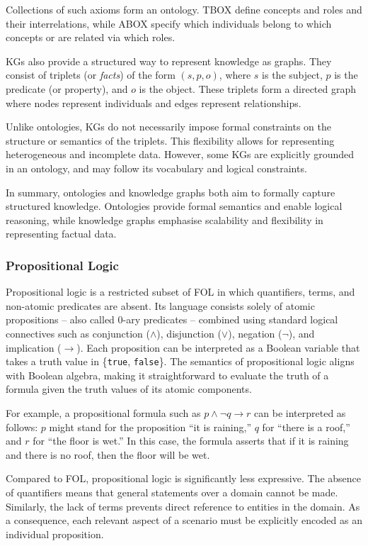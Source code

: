Collections of such axioms form an ontology.
%
\Gls{TBOX} define concepts and roles and their interrelations, while \gls{ABOX} specify which individuals belong to which concepts or are related via which roles.

\Glspl{KG} also provide a structured way to represent knowledge as graphs.
%
They consist of triplets (or \emph{facts}) of the form $(s, p, o)$, where $s$ is the subject, $p$ is the predicate (or property), and $o$ is the object.
%
These triplets form a directed graph where nodes represent individuals and edges represent relationships.

Unlike ontologies, KGs do not necessarily impose formal constraints on the structure or semantics of the triplets.
%
This flexibility allows for representing heterogeneous and incomplete data.
%
However, some \glspl{KG} are explicitly grounded in an ontology, and may follow its vocabulary and logical constraints.

In summary, ontologies and knowledge graphs both aim to formally capture structured knowledge.
%
Ontologies provide formal semantics and enable logical reasoning, while knowledge graphs emphasise scalability and flexibility in representing factual data.


\subsubsection{Propositional Logic}\label{subsubsec:propositional-logic}
%
Propositional logic is a restricted subset of \gls{FOL} in which quantifiers, terms, and non-atomic predicates are absent.
%
Its language consists solely of atomic propositions -- also called 0-ary predicates -- combined using standard logical connectives such as conjunction ($\land$), disjunction ($\lor$), negation ($\lnot$), and implication ($\rightarrow$).
%
Each proposition can be interpreted as a Boolean variable that takes a truth value in \{\texttt{true}, \texttt{false}\}.
%
The semantics of propositional logic aligns with Boolean algebra, making it straightforward to evaluate the truth of a formula given the truth values of its atomic components.

For example, a propositional formula such as $p \land \lnot q \rightarrow r$ can be interpreted as follows:
%
$p$ might stand for the proposition ``it is raining,'' $q$ for ``there is a roof,'' and $r$ for ``the floor is wet.''
%
In this case, the formula asserts that if it is raining and there is no roof, then the floor will be wet.

Compared to \gls{FOL}, propositional logic is significantly less expressive.
%
The absence of quantifiers means that general statements over a domain cannot be made.
%
Similarly, the lack of terms prevents direct reference to entities in the domain.
%
As a consequence, each relevant aspect of a scenario must be explicitly encoded as an individual proposition.

